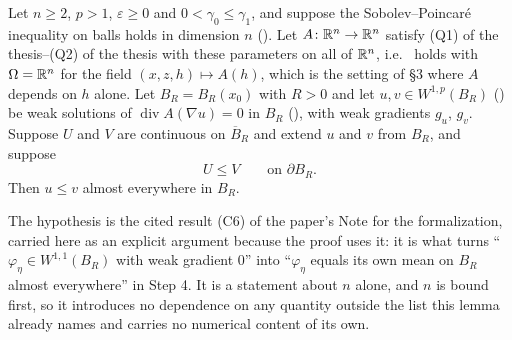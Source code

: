 \begin{helper}
Let $n\ge2$, $p>1$, $\varepsilon\ge0$ and $0<\gamma_0\le\gamma_1$, and suppose
the Sobolev--Poincar\'e inequality on balls holds in dimension $n$
().  Let
$A\colon\mathbb{R}^n\to\mathbb{R}^n$ satisfy (Q1) of the thesis--(Q2) of the thesis with these parameters
on all of $\mathbb{R}^n$, i.e.\  holds with
$\Omega=\mathbb{R}^n$ for the field $(x,z,h)\mapsto A(h)$, which is the setting of \S3
where $A$ depends on $h$ alone.  Let $B_R=B_R(x_0)$ with $R>0$ and let $u,v\in
W^{1,p}(B_R)$ () be weak solutions of
$\operatorname{div}A(\nabla u)=0$ in $B_R$ (), with
weak gradients $g_u$, $g_v$.  Suppose $U$ and $V$ are continuous on
$\overline B_R$ and extend $u$ and $v$ from $B_R$, and suppose
\[
U\le V\qquad\text{on }\partial B_R .
\]
Then $u\le v$ almost everywhere in $B_R$.

The hypothesis  is the cited result (C6) of the
paper's Note for the formalization, carried here as an explicit argument because
the proof uses it: it is what turns ``$\varphi_\eta\in W^{1,1}(B_R)$ with weak
gradient $0$'' into ``$\varphi_\eta$ equals its own mean on $B_R$ almost
everywhere'' in Step 4.  It is a statement about $n$ alone, and $n$ is bound
first, so it introduces no dependence on any quantity outside the list this
lemma already names and carries no numerical content of its own.
\end{helper}

